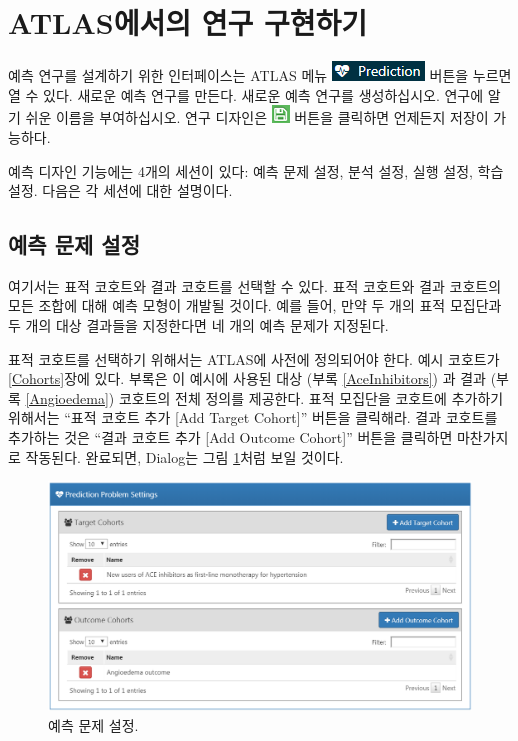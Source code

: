 \documentclass[11pt]{book}
\theoremstyle{definition}
\theoremstyle{definition}
\theoremstyle{definition}
\theoremstyle{remark}
\begin{document}
\section{ATLAS에서의 연구 구현하기}\label{atlas--}

예측 연구를 설계하기 위한 인터페이스는 ATLAS 메뉴
\includegraphics{images/PatientLevelPrediction/predictionButton.png}
버튼을 누르면 열 수 있다. 새로운 예측 연구를 만든다. 새로운 예측 연구를
생성하십시오. 연구에 알기 쉬운 이름을 부여하십시오. 연구 디자인은
\includegraphics{images/PopulationLevelEstimation/save.png} 버튼을
클릭하면 언제든지 저장이 가능하다. 

예측 디자인 기능에는 4개의 세션이 있다: 예측 문제 설정, 분석 설정, 실행
설정, 학습 설정. 다음은 각 세션에 대한 설명이다.

\subsection{예측 문제 설정}\label{--}

여기서는 표적 코호트와 결과 코호트를 선택할 수 있다. 표적 코호트와 결과
코호트의 모든 조합에 대해 예측 모형이 개발될 것이다. 예를 들어, 만약 두
개의 표적 모집단과 두 개의 대상 결과들을 지정한다면 네 개의 예측 문제가
지정된다.

표적 코호트를 선택하기 위해서는 ATLAS에 사전에 정의되어야 한다. 예시
코호트가 \ref{Cohorts}장에 있다. 부록은 이 예시에 사용된 대상 (부록
\ref{AceInhibitors}) 과 결과 (부록 \ref{Angioedema}) 코호트의 전체
정의를 제공한다. 표적 모집단을 코호트에 추가하기 위해서는 ``표적 코호트
추가 {[}Add Target Cohort{]}'' 버튼을 클릭해라. 결과 코호트를 추가하는
것은 ``결과 코호트 추가 {[}Add Outcome Cohort{]}'' 버튼을 클릭하면
마찬가지로 작동된다. 완료되면, Dialog는 그림
\ref{fig:problemSettings}처럼 보일 것이다.

\begin{figure}

{\centering \includegraphics[width=1\linewidth]{images/PatientLevelPrediction/problemSettings} 

}

\caption{예측 문제 설정.}\label{fig:problemSettings}
\end{figure}
\end{document}
